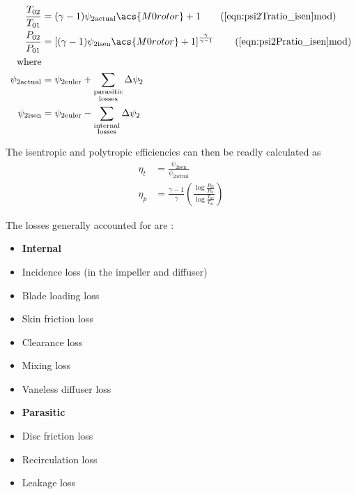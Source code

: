\documentclass[tcc]{subfiles}
\begin{document}
\begin{align}
    \frac{T_{02}}{T_{01}} &= (\gamma - 1)\psi_{2\text{actual}} \acs{M0rotor} + 1
    \tag{\ref{eqn:psi2Tratio_isen}mod} \\
    \frac{P_{02}}{P_{01}} &= \left[(\gamma - 1)\psi_{2\text{isen}} \acs{M0rotor} + 1\right]^\frac{\gamma}{\gamma-1}
    \tag{\ref{eqn:psi2Pratio_isen}mod}\\
    \text{where} \notag\\
    \psi_{2\text{actual}} &= \psi_{2\text{euler}} + \sum_{\substack{
                                                            \text{parasitic} \\ 
                                                            \text{losses}
                                                        }}
                                                          \Delta \psi_2 \\
    \psi_{2\text{isen}}  &= \psi_{2\text{euler}} - \sum_{\substack{
                                                            \text{internal} \\ 
                                                            \text{losses}
                                                        }}
                                                          \Delta \psi_2 
\end{align}

The isentropic and polytropic efficiencies can then be readly calculated as
\begin{align}
    \eta_t &= \frac{\psi_{2\text{isen}}}{\psi_{2\text{actual}}}\\
    \eta_p &= \frac{\gamma-1}{\gamma} \left(\frac{\log\frac{P_{02}}{P_{01}}}
                                                 {\log\frac{T_{02}}{T_{01}}}
                                     \right)
\end{align}



The losses generally accounted for are \cite{Oh1997}:
\begin{itemize}
    \item[] \textbf{Internal}
    \item Incidence loss (in the impeller and diffuser)
    \item Blade loading loss
    \item Skin friction loss
    \item Clearance loss
    \item Mixing loss
    \item Vaneless diffuser loss
    \item[] \textbf{Parasitic}
    \item Disc friction loss
    \item Recirculation loss
    \item Leakage loss
\end{itemize}
\end{document}
